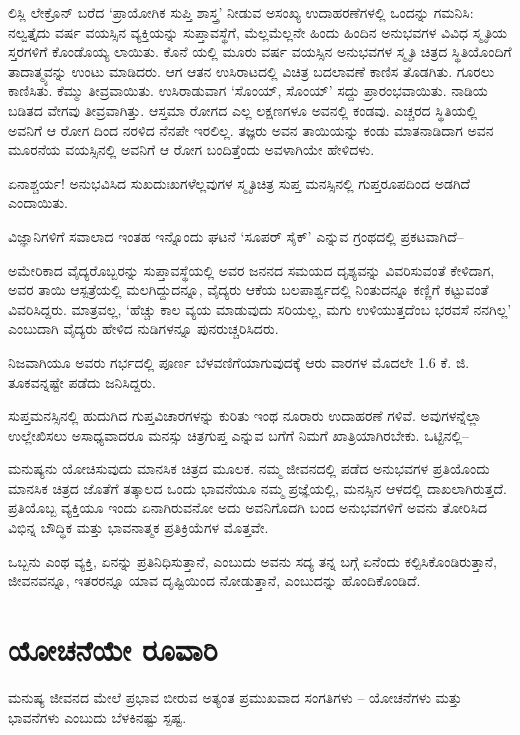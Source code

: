 ಲಿಸ್ಲಿ ಲೇಕ್ರೊನ್ ಬರೆದ ‘ಪ್ರಾಯೋಗಿಕ ಸುಪ್ತಿ ಶಾಸ್ತ್ರ’ ನೀಡುವ ಅಸಂಖ್ಯ ಉದಾಹರಣೆಗಳಲ್ಲಿ ಒಂದನ್ನು ಗಮನಿಸಿ: ನಲ್ವತ್ತೈದು ವರ್ಷ ವಯಸ್ಸಿನ ವ್ಯಕ್ತಿಯನ್ನು ಸುಪ್ತಾವಸ್ಥೆಗೆ, ಮೆಲ್ಲಮೆಲ್ಲನೇ ಹಿಂದು ಹಿಂದಿನ ಅನುಭವಗಳ ವಿವಿಧ ಸ್ಮೃತಿಯ ಸ್ತರಗಳಿಗೆ ಕೊಂಡೊಯ್ಯ ಲಾಯಿತು. ಕೊನೆ ಯಲ್ಲಿ ಮೂರು ವರ್ಷ ವಯಸ್ಸಿನ ಅನುಭವಗಳ ಸ್ಮೃತಿ ಚಿತ್ರದ ಸ್ಥಿತಿಯೊಂದಿಗೆ ತಾದಾತ್ಮ್ಯವನ್ನು ಉಂಟು ಮಾಡಿದರು. ಆಗ ಆತನ ಉಸಿರಾಟದಲ್ಲಿ ವಿಚಿತ್ರ ಬದಲಾವಣೆ ಕಾಣಿಸ ತೊಡಗಿತು. ಗೂರಲು ಕಾಣಿಸಿತು. ಕೆಮ್ಮು ತೀವ್ರವಾಯಿತು. ಉಸಿರಾಡುವಾಗ ‘ಸೊಂಯ್, ಸೊಂಯ್​’ ಸದ್ದು ಪ್ರಾರಂಭವಾಯಿತು. ನಾಡಿಯ ಬಡಿತದ ವೇಗವು ತೀವ್ರವಾಗಿತ್ತು. ಆಸ್ತಮಾ ರೋಗದ ಎಲ್ಲ ಲಕ್ಷಣಗಳೂ ಅವನಲ್ಲಿ ಕಂಡವು. ಎಚ್ಚರದ ಸ್ಥಿತಿಯಲ್ಲಿ ಅವನಿಗೆ ಆ ರೋಗ ದಿಂದ ನರಳಿದ ನೆನಪೇ ಇರಲಿಲ್ಲ. ತಜ್ಞರು ಅವನ ತಾಯಿಯನ್ನು ಕಂಡು ಮಾತನಾಡಿದಾಗ ಅವನ ಮೂರನೆಯ ವಯಸ್ಸಿನಲ್ಲಿ ಅವನಿಗೆ ಆ ರೋಗ ಬಂದಿತ್ತೆಂದು ಅವಳಾಗಿಯೇ ಹೇಳಿದಳು.

ಏನಾಶ್ಚರ್ಯ! ಅನುಭವಿಸಿದ ಸುಖದುಃಖಗಳೆಲ್ಲವುಗಳ ಸ್ಮೃತಿಚಿತ್ರ ಸುಪ್ತ ಮನಸ್ಸಿನಲ್ಲಿ ಗುಪ್ತರೂಪದಿಂದ ಅಡಗಿದೆ ಎಂದಾಯಿತು.

ವಿಜ್ಞಾನಿಗಳಿಗೆ ಸವಾಲಾದ ಇಂತಹ ಇನ್ನೊಂದು ಘಟನೆ ‘ಸೂಪರ್ ಸೈಕ್​’ ಎನ್ನುವ ಗ್ರಂಥದಲ್ಲಿ ಪ್ರಕಟವಾಗಿದೆ–

ಅಮೇರಿಕಾದ ವೈದ್ಯರೊಬ್ಬರನ್ನು ಸುಪ್ತಾವಸ್ಥೆಯಲ್ಲಿ ಅವರ ಜನನದ ಸಮಯದ ದೃಶ್ಯವನ್ನು ವಿವರಿಸುವಂತೆ ಕೇಳಿದಾಗ, ಅವರ ತಾಯಿ ಆಸ್ಪತ್ರೆಯಲ್ಲಿ ಮಲಗಿದ್ದುದನ್ನೂ, ವೈದ್ಯರು ಆಕೆಯ ಬಲಪಾರ್ಶ್ವದಲ್ಲಿ ನಿಂತುದನ್ನೂ ಕಣ್ಣಿಗೆ ಕಟ್ಟುವಂತೆ ವಿವರಿಸಿದ್ದರು. ಮಾತ್ರವಲ್ಲ, ‘ಹೆಚ್ಚು ಕಾಲ ವ್ಯಯ ಮಾಡುವುದು ಸರಿಯಲ್ಲ, ಮಗು ಉಳಿಯುತ್ತದೆಂಬ ಭರವಸೆ ನನಗಿಲ್ಲ’ ಎಂಬುದಾಗಿ ವೈದ್ಯರು ಹೇಳಿದ ನುಡಿಗಳನ್ನೂ ಪುನರುಚ್ಚರಿಸಿದರು.

ನಿಜವಾಗಿಯೂ ಅವರು ಗರ್ಭದಲ್ಲಿ ಪೂರ್ಣ ಬೆಳವಣಿಗೆಯಾಗುವುದಕ್ಕೆ ಆರು ವಾರಗಳ ಮೊದಲೇ 1.6 ಕೆ. ಜಿ. ತೂಕವನ್ನಷ್ಟೇ ಪಡೆದು ಜನಿಸಿದ್ದರು.

ಸುಪ್ತಮನಸ್ಸಿನಲ್ಲಿ ಹುದುಗಿದ ಗುಪ್ತವಿಚಾರಗಳನ್ನು ಕುರಿತು ಇಂಥ ನೂರಾರು ಉದಾಹರಣೆ ಗಳಿವೆ. ಅವುಗಳನ್ನೆಲ್ಲಾ ಉಲ್ಲೇಖಿಸಲು ಅಸಾಧ್ಯವಾದರೂ ಮನಸ್ಸು ಚಿತ್ರಗುಪ್ತ ಎನ್ನುವ ಬಗೆಗೆ ನಿಮಗೆ ಖಾತ್ರಿಯಾಗಿರಬೇಕು. ಒಟ್ಟಿನಲ್ಲಿ–

ಮನುಷ್ಯನು ಯೋಚಿಸುವುದು ಮಾನಸಿಕ ಚಿತ್ರದ ಮೂಲಕ. ನಮ್ಮ ಜೀವನದಲ್ಲಿ ಪಡೆದ ಅನುಭವಗಳ ಪ್ರತಿಯೊಂದು ಮಾನಸಿಕ ಚಿತ್ರದ ಜೊತೆಗೆ ತತ್ಕಾಲದ ಒಂದು ಭಾವನೆಯೂ ನಮ್ಮ ಪ್ರಜ್ಞೆಯಲ್ಲಿ, ಮನಸ್ಸಿನ ಆಳದಲ್ಲಿ ದಾಖಲಾಗಿರುತ್ತದೆ. ಪ್ರತಿಯೊಬ್ಬ ವ್ಯಕ್ತಿಯೂ ಇಂದು ಏನಾಗಿರು\-ವನೋ ಅದು ಅವನಿಗೊದಗಿ ಬಂದ ಅನುಭವಗಳಿಗೆ ಅವನು ತೋರಿಸಿದ ವಿಭಿನ್ನ ಬೌದ್ಧಿಕ ಮತ್ತು ಭಾವನಾತ್ಮಕ ಪ್ರತಿಕ್ರಿಯೆಗಳ ಮೊತ್ತವೇ.

ಒಬ್ಬನು ಎಂಥ ವ್ಯಕ್ತಿ, ಏನನ್ನು ಪ್ರತಿನಿಧಿಸುತ್ತಾನೆ, ಎಂಬುದು ಅವನು ಸದ್ಯ ತನ್ನ ಬಗ್ಗೆ ಏನೆಂದು ಕಲ್ಪಿಸಿಕೊಂಡಿರುತ್ತಾನೆ, ಜೀವನವನ್ನೂ, ಇತರರನ್ನೂ ಯಾವ ದೃಷ್ಟಿಯಿಂದ ನೋಡುತ್ತಾನೆ, ಎಂಬುದನ್ನು ಹೊಂದಿಕೊಂಡಿದೆ.


\section*{ಯೋಚನೆಯೇ ರೂವಾರಿ}


ಮನುಷ್ಯ ಜೀವನದ ಮೇಲೆ ಪ್ರಭಾವ ಬೀರುವ ಅತ್ಯಂತ ಪ್ರಮುಖವಾದ ಸಂಗತಿಗಳು – ಯೋಚನೆಗಳು ಮತ್ತು ಭಾವನೆಗಳು ಎಂಬುದು ಬೆಳಕಿನಷ್ಟು ಸ್ಪಷ್ಟ.

